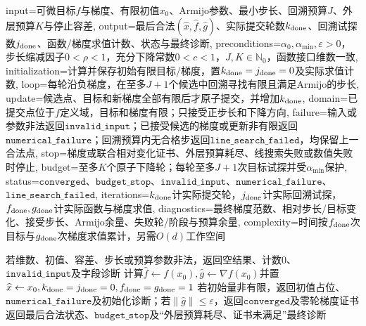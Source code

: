 \begin{AlgorithmContract}{
  input={可微目标$f$与梯度、有限初值$x_0$、Armijo参数、最小步长、回溯预算$J$、外层预算$K$与停止容差},
  output={最后合法$(\widehat x,\widehat f,\widehat g)$、实际提交轮数$k_{\rm done}$、回溯试探数$j_{\rm done}$、函数/梯度求值计数、状态与最终诊断},
  preconditions={$\alpha_0,\alpha_{\min},\varepsilon>0$，步长缩减因子$0<\rho<1$，充分下降常数$0<c<1$，$J,K\in\mathbb N_0$，函数接口维数一致},
  initialization={计算并保存初始有限目标/梯度，置$k_{\rm done}=j_{\rm done}=0$及实际求值计数},
  loop={每轮沿负梯度，在至多$J+1$个候选中回溯寻找有限且满足Armijo的步长},
  update={候选点、目标和新梯度全部有限后才原子提交，并增加$k_{\rm done}$},
  domain={已提交点位于$f$定义域，目标和梯度有限；只接受正步长和下降方向},
  failure={输入或参数非法返回$\mathtt{invalid\_input}$；已接受候选的梯度或更新非有限返回$\mathtt{numerical\_failure}$；回溯预算内无合格步返回$\mathtt{line\_search\_failed}$，均保留上一合法点},
  stop={梯度或联合相对变化证书、外层预算耗尽、线搜索失败或数值失败时停止},
  budget={至多$K$个原子下降轮；每轮至多$J+1$次目标试探并受$\alpha_{\min}$保护},
  status={$\mathtt{converged}$、$\mathtt{budget\_stop}$、$\mathtt{invalid\_input}$、$\mathtt{numerical\_failure}$、$\mathtt{line\_search\_failed}$},
  iterations={$k_{\rm done}$计实际提交轮，$j_{\rm done}$计实际回溯试探，$f_{\rm done},g_{\rm done}$计实际函数与梯度求值},
  diagnostics={最终梯度范数、相对步长/目标变化、接受步长、Armijo余量、失败轮/阶段与预算余量},
  complexity={时间按$f_{\rm done}$次目标与$g_{\rm done}$次梯度求值累计，另需$O(d)$工作空间}
}
\begin{algorithm}[H]
\caption{带Armijo回溯的梯度下降}\label{alg:V1-C08-gradient}
若维数、初值、容差、步长或预算参数非法，返回空结果、计数$0$、$\mathtt{invalid\_input}$及字段诊断\;
计算$\widehat f\leftarrow f(x_0),\widehat g\leftarrow\nabla f(x_0)$并置$\widehat x\leftarrow x_0,k_{\rm done}=j_{\rm done}=0,f_{\rm done}=g_{\rm done}=1$\;
若初始量非有限，返回初值占位、$\mathtt{numerical\_failure}$及初始化诊断；若$\|\widehat g\|\le\varepsilon$，返回$\mathtt{converged}$及零轮梯度证书\;
返回最后合法状态、$\mathtt{budget\_stop}$及“外层预算耗尽、证书未满足”最终诊断\;
\end{algorithm}
\end{AlgorithmContract}
